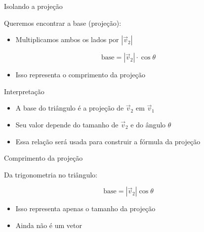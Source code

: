 \documentclass{beamer}
\begin{document}
\begin{frame}{Isolando a projeção}


\vspace{0.5cm}

Queremos encontrar a base (projeção):

\begin{itemize}
    \item Multiplicamos ambos os lados por $|\vec{v}_2|$
\end{itemize}

\vspace{0.5cm}

\[
\text{base} = |\vec{v}_2| \cdot \cos\theta
\]

\vspace{0.5cm}

\begin{itemize}
    \item Isso representa o comprimento da projeção
\end{itemize}

\end{frame}
\begin{frame}{Interpretação}


\vspace{0.5cm}

\begin{itemize}
    \item A base do triângulo é a projeção de $\vec{v}_2$ em $\vec{v}_1$
    \item Seu valor depende do tamanho de $\vec{v}_2$ e do ângulo $\theta$
    \item Essa relação será usada para construir a fórmula da projeção
\end{itemize}

\end{frame}
\begin{frame}{Comprimento da projeção}


\vspace{0.5cm}

Da trigonometria no triângulo:

\[
\text{base} = |\vec{v}_2| \cos\theta
\]

\vspace{0.5cm}

\begin{itemize}
    \item Isso representa apenas o tamanho da projeção
    \item Ainda não é um vetor
\end{itemize}

\end{frame}
\end{document}
